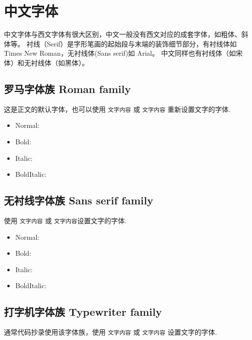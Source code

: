 \section{中文字体}

中文字体与西文字体有很大区别，中文一般没有西文对应的成套字体，如粗体、斜体等。
衬线（Serif）是字形笔画的起始段与末端的装饰细节部分，有衬线体如Times New Roman，无衬线体(Sans serif)如 Arial。
中文同样也有衬线体（如宋体）和无衬线体（如黑体）。

\subsection{罗马字体族 Roman family}

这是正文的默认字体，也可以使用 \texttt{\textrm{文字内容}} 或 \texttt{{\rmfamily 文字内容}} 重新设置文字的字体.

\begin{itemize}
  \item Normal: {\rmfamily \mdseries \sampletext}
  \item Bold: {\rmfamily \bfseries \sampletext}
  \item Italic: {\rmfamily \itshape \sampletext}
  \item BoldItalic: {\rmfamily \bfseries \itshape \sampletext}
\end{itemize}

\subsection{无衬线字体族 Sans serif family}

使用 \texttt{\textsf{文字内容}} 或 \texttt{{\sffamily 文字内容}}设置文字的字体.

\begin{itemize}
  \item Normal: {\sffamily \mdseries \sampletext}
  \item Bold: {\sffamily \bfseries \sampletext}
  \item Italic: {\sffamily \itshape \sampletext}
  \item BoldItalic: {\sffamily \bfseries \itshape \sampletext}
\end{itemize}

\subsection{打字机字体族 Typewriter family}

通常代码抄录使用该字体族，使用 \texttt{\texttt{文字内容}} 或 \texttt{{\ttfamily 文字内容}} 设置文字的字体.

